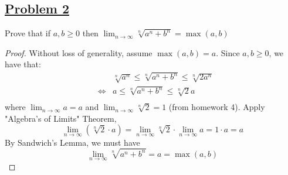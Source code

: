 \documentclass[10pt,letterpaper]{article}
\begin{document}
	\subsection*{{\color{purple}\underline{Problem 2}}}
	Prove that if $a, b \geq 0$ then $\displaystyle\lim_{n\to\infty}\sqrt[n]{a^n + b^n} = \max(a, b)$ 
	\begin{proof} Without loss of generality, assume $\max(a, b) = a$. Since $a, b \geq 0$, we 
	have that:
	\begin{eqnarray*}
	& & \sqrt[n]{a^n} \leq \sqrt[n]{a^n + b^n} \leq \sqrt[n]{2a^n} \\
	&\Leftrightarrow & a \leq \sqrt[n]{a^n + b^n} \leq \sqrt[n]{2}a \\
	\end{eqnarray*}
	where $\displaystyle\lim_{n\to\infty} a = a$ and $\displaystyle\lim_{n\to\infty} \sqrt[n]{2} = 1$ (from homework 4).
	Apply "Algebra's of Limits" Theorem, 
	$$\displaystyle\lim_{n\to\infty} (\sqrt[n]{2} \cdot a) = 
	\displaystyle\lim_{n\to\infty} \sqrt[n]{2} \cdot \displaystyle\lim_{n\to\infty} a = 1 \cdot a = a$$  
	By Sandwich's Lemma, we must have
	$$\displaystyle\lim_{n\to\infty}\sqrt[n]{a^n + b^n} = a = \max(a, b)$$
	
	\end{proof}		
	
	
\end{document}
